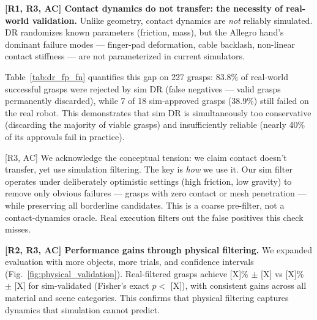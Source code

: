 \documentclass[conference]{IEEEtran}
\newcommand{\rone}{{\color{R1}R1}}
\newcommand{\rtwo}{{\color{R2}R2}}
\newcommand{\rthree}{{\color{R3}R3}}
\newcommand{\acmark}{{\color{AC}AC}}
\newcommand{\rssparagraph}[1]{{\bf #1.}}
\begin{document}
\rssparagraph{[\rone, \rthree, \acmark] Contact dynamics do not transfer: the necessity of real-world validation}
Unlike geometry, contact dynamics are \emph{not} reliably simulated. DR randomizes known parameters (friction, mass), but the Allegro hand's dominant failure modes --- finger-pad deformation, cable backlash, non-linear contact stiffness --- are not parameterized in current simulators.

Table~\ref{tab:dr_fp_fn} quantifies this gap on 227 grasps: 83.8\% of real-world successful grasps were rejected by sim DR (false negatives --- valid grasps permanently discarded), while 7 of 18 sim-approved grasps (38.9\%) still failed on the real robot. This demonstrates that sim DR is simultaneously too conservative (discarding the majority of viable grasps) and insufficiently reliable (nearly 40\% of its approvals fail in practice).

[\rthree, \acmark] We acknowledge the conceptual tension: we claim contact doesn't transfer, yet use simulation filtering. The key is \emph{how} we use it. Our sim filter operates under deliberately optimistic settings (high friction, low gravity) to remove only obvious failures --- grasps with zero contact or mesh penetration --- while preserving all borderline candidates. This is a coarse pre-filter, not a contact-dynamics oracle. Real execution filters out the false positives this check misses.


\rssparagraph{[\rtwo, \rthree, \acmark] Performance gains through physical filtering}
We expanded evaluation with more objects, more trials, and confidence intervals (Fig.~\ref{fig:physical_validation}). Real-filtered grasps achieve [X]\% $\pm$ [X] vs [X]\% $\pm$ [X] for sim-validated (Fisher's exact $p < $ [X]), with consistent gains across all material and scene categories. This confirms that physical filtering captures dynamics that simulation cannot predict.

\end{document}
